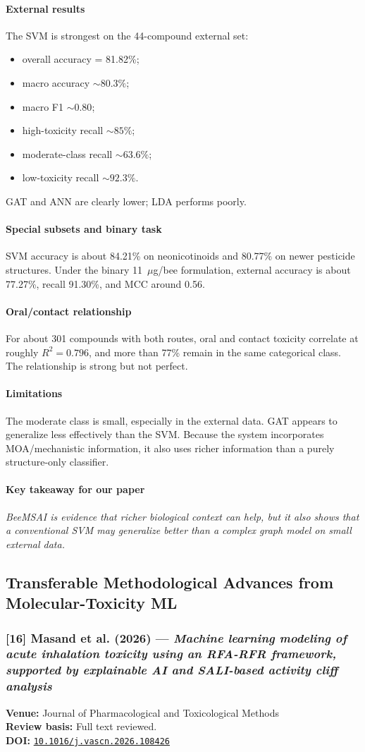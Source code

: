 \documentclass[11pt]{article}
\newcommand{\reviewfield}[2]{\paragraph{#1}#2}
\newcommand{\keytakeaway}[1]{\paragraph{Key takeaway for our paper}\emph{#1}}
\newcommand{\paperdoi}[1]{\href{https://doi.org/#1}{\texttt{#1}}}
\begin{document}
\reviewfield{External results}{
The SVM is strongest on the 44-compound external set:
\begin{itemize}
    \item overall accuracy = 81.82\%;
    \item macro accuracy $\sim80.3\%$;
    \item macro F1 $\sim0.80$;
    \item high-toxicity recall $\sim85\%$;
    \item moderate-class recall $\sim63.6\%$;
    \item low-toxicity recall $\sim92.3\%$.
\end{itemize}
GAT and ANN are clearly lower; LDA performs poorly.
}

\reviewfield{Special subsets and binary task}{
SVM accuracy is about 84.21\% on neonicotinoids and 80.77\% on newer pesticide structures. Under the binary 11~$\mu$g/bee formulation, external accuracy is about 77.27\%, recall 91.30\%, and MCC around 0.56.
}

\reviewfield{Oral/contact relationship}{
For about 301 compounds with both routes, oral and contact toxicity correlate at roughly $R^2=0.796$, and more than 77\% remain in the same categorical class. The relationship is strong but not perfect.
}

\reviewfield{Limitations}{
The moderate class is small, especially in the external data. GAT appears to generalize less effectively than the SVM. Because the system incorporates MOA/mechanistic information, it also uses richer information than a purely structure-only classifier.
}

\keytakeaway{BeeMSAI is evidence that richer biological context can help, but it also shows that a conventional SVM may generalize better than a complex graph model on small external data.}

\subsection{Transferable Methodological Advances from Molecular-Toxicity ML}

\subsubsection{[16] Masand et al. (2026) --- \textit{Machine learning modeling of acute inhalation toxicity using an RFA-RFR framework, supported by explainable AI and SALI-based activity cliff analysis}}
\textbf{Venue:} Journal of Pharmacological and Toxicological Methods\\
\textbf{Review basis:} Full text reviewed.\\
\textbf{DOI:} \paperdoi{10.1016/j.vascn.2026.108426}
\end{document}
